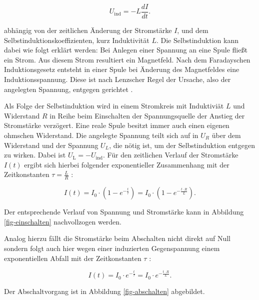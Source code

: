 \documentclass[page,pdftex,12pt,a4paper,twoside,openright]{scrbook}
\begin{document}
\begin{equation}
\label{eq-induktivitaet}
U_\mathrm{ind} = - L \frac{dI}{dt} .
\end{equation}

abhängig von der zeitlichen Änderung der Stromstärke \(I\), und dem Selbstinduktionskoeffizienten, kurz Induktivität \(L\). Die Selbstinduktion kann dabei wie folgt erklärt werden: Bei Anlegen einer Spannung an eine Spule fließt ein Strom. Aus diesem Strom resultiert ein Magnetfeld. Nach dem Faradayschen Induktionsgesetz entsteht in einer Spule bei Änderung des Magnetfeldes eine Induktionsspannung. Diese ist nach Lenzscher Regel der Ursache, also der angelegten Spannung, entgegen gerichtet \cite{demtroder_experimentalphysik_2017}.

Als Folge der Selbstinduktion wird in einem Stromkreis mit Induktiviät \(L\) und Widerstand \(R\) in Reihe beim Einschalten der Spannungsquelle der Anstieg der Stromstärke verzögert. Eine reale Spule besitzt immer auch einen eigenen ohmschen Widerstand. Die angelegte Spannung teilt sich auf in \(U_R\) über dem Widerstand und der Spannung \(U_L\), die nötig ist, um der Selbstinduktion entgegen zu wirken. Dabei ist \(U_{\mathrm{L}} = - U_{\mathrm{ind}}\). Für den zeitlichen Verlauf der Stromstärke \(I(t)\) ergibt sich hierbei folgender exponentieller Zusammenhang mit der Zeitkonstanten \(\tau = \frac{L}{R}\) \cite{raith_elektromagnetismus_2006}:

\begin{equation}
\label{eq-strom-spule}
I(t) = I_{\mathrm{0}} \cdot (1 - e^{ -\frac{t}{\tau}})= I_{\mathrm{0}} \cdot (1- e^{ -\frac{t \cdot R}{L}}).
\end{equation}

Der entsprechende Verlauf von Spannung und Stromstärke kann in Abbildung \ref{fig-einschalten} nachvollzogen werden.


Analog hierzu fällt die Stromstärke beim Abschalten nicht direkt auf Null sondern folgt auch hier wegen einer induzierten Gegenspannung einem exponentiellen Abfall mit der Zeitkonstanten \(\tau\) \cite{raith_elektromagnetismus_2006}:

\begin{equation}
\label{eq-auschalten}
I(t) = I_{\mathrm{0}} \cdot e^{ -\frac{t}{\tau}}= I_{\mathrm{0}} \cdot e^{ -\frac{t \cdot R}{L}}.
\end{equation}

Der Abschaltvorgang ist in Abbildung \ref{fig-abschalten} abgebildet.
\end{document}
